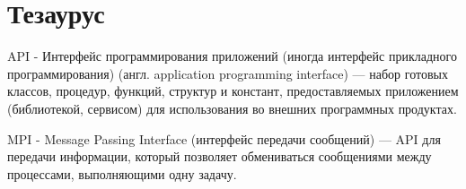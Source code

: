 \chapter{Тезаурус}
API - Интерфейс программирования приложений (иногда интерфейс прикладного программирования) (англ. application programming interface) — набор готовых классов, процедур, функций, структур и констант, предоставляемых приложением (библиотекой, сервисом) для использования во внешних программных продуктах. 

MPI - Message Passing Interface (интерфейс передачи сообщений) — API для передачи информации, который позволяет обмениваться сообщениями между процессами, выполняющими одну задачу.
